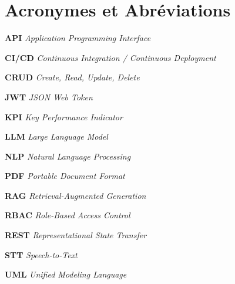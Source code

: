 \documentclass[a4paper,12pt]{report}
\begin{document}
\newpage
\tableofcontents
\newpage
\listoffigures
\newpage
\listoftables
\newpage

\chapter*{Acronymes et Abr\'{e}viations}

\noindent\textbf{API} \hspace{1.5cm} \textit{Application Programming Interface}

\noindent\textbf{CI/CD} \hspace{1.1cm} \textit{Continuous Integration / Continuous Deployment}

\noindent\textbf{CRUD} \hspace{1.1cm} \textit{Create, Read, Update, Delete}

\noindent\textbf{JWT} \hspace{1.4cm} \textit{JSON Web Token}

\noindent\textbf{KPI} \hspace{1.55cm} \textit{Key Performance Indicator}

\noindent\textbf{LLM} \hspace{1.45cm} \textit{Large Language Model}

\noindent\textbf{NLP} \hspace{1.5cm} \textit{Natural Language Processing}

\noindent\textbf{PDF} \hspace{1.55cm} \textit{Portable Document Format}

\noindent\textbf{RAG} \hspace{1.5cm} \textit{Retrieval-Augmented Generation}

\noindent\textbf{RBAC} \hspace{1.2cm} \textit{Role-Based Access Control}

\noindent\textbf{REST} \hspace{1.3cm} \textit{Representational State Transfer}

\noindent\textbf{STT} \hspace{1.55cm} \textit{Speech-to-Text}

\noindent\textbf{UML} \hspace{1.4cm} \textit{Unified Modeling Language}

\newpage




% 
% 
\end{document}
